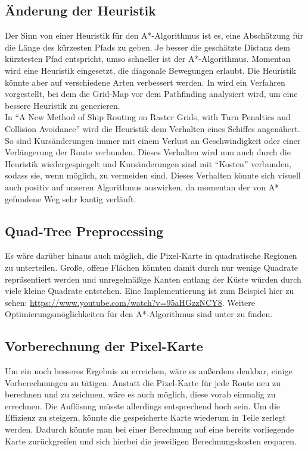 \documentclass[letterpaper]{article}
\begin{document}

	\subsection{Änderung der Heuristik}
		Der Sinn von einer Heuristik für den A*-Algorithmus ist es, eine Abschätzung für die Länge des kürzesten Pfads zu geben. Je besser die geschätzte Distanz dem kürztesten Pfad entspricht, umso schneller ist der A*-Algorithmus. Momentan wird eine Heuristik eingesetzt, die diagonale Bewegungen erlaubt. Die Heuristik könnte aber auf verschiedene Arten verbessert werden. In \cite{andrew04} wird ein Verfahren vorgestellt, bei dem die Grid-Map vor dem Pathfinding analysiert wird, um eine bessere Heuristik zu generieren.\\

		In "`A New Method of Ship Routing on Raster Grids, with Turn Penalties and Collision Avoidance"'\cite{szlapczynski06} wird die Heuristik dem Verhalten eines Schiffes angenähert. So sind Kursänderungen immer mit einem Verlust an Geschwindigkeit oder einer Verlängerung der Route verbunden. Dieses Verhalten wird nun auch durch die Heuristik wiedergespiegelt und Kursänderungen sind mit "`Kosten"' verbunden, sodass sie, wenn möglich, zu vermeiden sind. Dieses Verhalten könnte sich visuell auch positiv auf unseren Algorithmus auswirken, da momentan der von A* gefundene Weg sehr kantig verläuft.

	\subsection{Quad-Tree Preprocessing}
		Es wäre darüber hinaus auch möglich, die Pixel-Karte in quadratische Regionen zu unterteilen. Große, offene Flächen könnten damit durch nur wenige Quadrate repräsentiert werden und unregelmäßige Kanten entlang der Küste würden durch viele kleine Quadrate entstehen. Eine Implementierung ist zum Beispiel hier zu sehen: \url{https://www.youtube.com/watch?v=95aHGzzNCY8}. Weitere Optimierungsmöglichkeiten für den A*-Algorithmus sind unter \cite{patel16} zu finden.

	\subsection{Vorberechnung der Pixel-Karte}
		Um ein noch besseres Ergebnis zu erreichen, wäre es außerdem denkbar, einige Vorberechnungen zu tätigen. Anstatt die Pixel-Karte für jede Route neu zu berechnen und zu zeichnen, wäre es auch möglich, diese vorab einmalig zu errechnen. Die Auflösung müsste allerdings entsprechend hoch sein. Um die Effizienz zu steigern, könnte die gespeicherte Karte wiederum in Teile zerlegt werden. Dadurch könnte man bei einer Berechnung auf eine bereits vorliegende Karte zurückgreifen und sich hierbei die jeweiligen Berechnungskosten ersparen.
\end{document}
